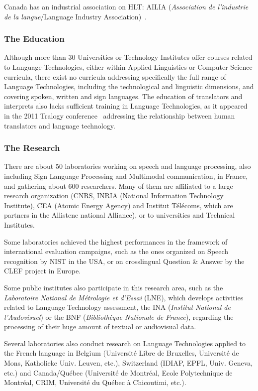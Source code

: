 \begin{multicols}{2}
Canada has an industrial association on HLT: AILIA ({\em Association de
l'industrie de la langue}/Language Industry Association)~\cite{ailia}.

\subsubsection{The Education}

Although more than 30 Universities or Technology Institutes offer
courses related to Language Technologies, either within Applied
Linguistics or Computer Science curricula, there exist no curricula
addressing specifically the full range of Language Technologies,
including the technological and linguistic dimensions, and covering
spoken, written and sign languages. The education of translators and
interprets also lacks sufficient training in Language Technologies, as
it appeared in the 2011 Tralogy conference~\cite{tralogy} addressing the
relationship between human translators and language technology.

\subsubsection{The Research}

There are about 50 laboratories working on speech and language
processing, also including Sign Language Processing and Multimodal
communication, in France, and gathering about 600 researchers. Many of
them are affiliated to a large research organization (CNRS, INRIA
(National Information Technology Institute), CEA (Atomic Energy
Agency) and Institut Télécoms, which are partners in the Allistene
national Alliance), or to universities and Technical Institutes.

Some laboratories achieved the highest performances in the framework
of international evaluation campaigns, such as the ones organized on
Speech recognition by NIST in the USA, or on crosslingual
Question \& Answer by the CLEF project in Europe.

Some public institutes also participate in this research area, such as
the {\em Laboratoire National de Métrologie et d’Essai} (LNE), which
develops activities related to Language Technology assessment, the INA
({\em Institut National de l’Audovisuel}) or the BNF ({\em Bibliothèque Nationale
de France}), regarding the processing of their huge amount of textual
or audiovisual data.

Several laboratories also conduct research on Language Technologies
applied to the French language in Belgium (Université  Libre de Bruxelles,
Université de Mons, Katholieke Univ. Leuven, etc.), Switzerland
(IDIAP, EPFL, Univ. Geneva, etc.) and Canada/Québec (Université de
Montréal, Ecole Polytechnique de Montréal, CRIM, Université du Québec
à Chicoutimi, etc.).


\end{multicols}
